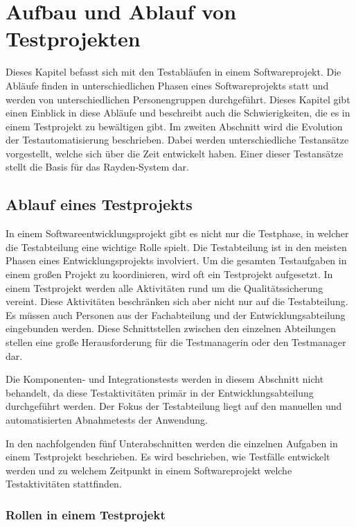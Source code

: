 \chapter{Aufbau und Ablauf von Testprojekten}
\label{cha:Konzept}

Dieses Kapitel befasst sich mit den Testabläufen in einem Softwareprojekt. Die Abläufe finden in unterschiedlichen Phasen eines Softwareprojekts statt und werden von unterschiedlichen Personengruppen durchgeführt. Dieses Kapitel gibt einen Einblick in diese Abläufe und beschreibt auch die Schwierigkeiten, die es in einem Testprojekt zu bewältigen gibt. Im zweiten Abschnitt wird die Evolution der Testautomatisierung beschrieben. Dabei werden unterschiedliche Testansätze vorgestellt, welche sich über die Zeit entwickelt haben. Einer dieser Testansätze stellt die Basis für das Rayden-System dar.

\section{Ablauf eines Testprojekts}

In einem Softwareentwicklungsprojekt gibt es nicht nur die Testphase, in welcher die Testabteilung eine wichtige Rolle spielt. Die Testabteilung ist in den meisten Phasen eines Entwicklungsprojekts involviert. Um die gesamten Testaufgaben in einem großen Projekt zu koordinieren, wird oft ein Testprojekt aufgesetzt. In einem Testprojekt werden alle Aktivitäten rund um die Qualitätssicherung vereint. Diese Aktivitäten beschränken sich aber nicht nur auf die Testabteilung. Es müssen auch Personen aus der Fachabteilung und der Entwicklungsabteilung eingebunden werden. Diese Schnittstellen zwischen den einzelnen Abteilungen stellen eine große Herausforderung für die Testmanagerin oder den Testmanager dar.

\SuperPar
Die Komponenten- und Integrationstests werden in diesem Abschnitt nicht behandelt, da diese Testaktivitäten primär in der Entwicklungsabteilung durchgeführt werden. Der Fokus der Testabteilung liegt auf den manuellen und automatisierten Abnahmetests der Anwendung.

\SuperPar
In den nachfolgenden fünf Unterabschnitten werden die einzelnen Aufgaben in einem Testprojekt beschrieben. Es wird beschrieben, wie Testfälle entwickelt werden und zu welchem Zeitpunkt in einem Softwareprojekt welche Testaktivitäten stattfinden.

\subsection{Rollen in einem Testprojekt}

